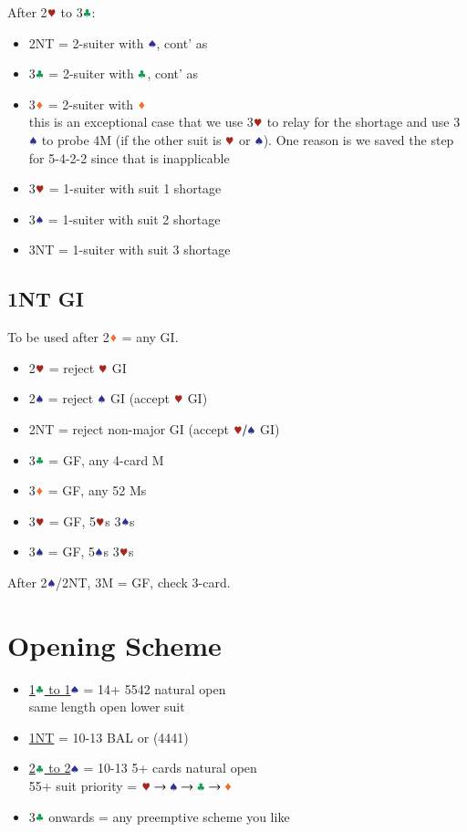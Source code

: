 \documentclass{article}
\begin{document}
\begin{multicols}{2}
\noindent After 2$\hhh$ to 3$\ccc$:
\begin{itemize}
    \item 2NT = 2-suiter with $\sss$, cont' as 
    \item 3$\ccc$ = 2-suiter with $\ccc$, cont' as 
    \item 3$\ddd$ = 2-suiter with $\ddd$ \\
        this is an exceptional case that we use 3$\hhh$ to relay for the shortage and use 3$\sss$ to probe 4M (if the other suit is $\hhh$ or $\sss$). One reason is we saved the step for 5-4-2-2 since that is inapplicable
    \item 3$\hhh$ = 1-suiter with suit 1 shortage
    \item 3$\sss$ = 1-suiter with suit 2 shortage
    \item 3NT = 1-suiter with suit 3 shortage
\end{itemize}

\subsection{1NT GI}\label{sec:1n-gi}
To be used after 2$\ddd$ = any GI.

\begin{itemize}
    \item 2$\hhh$ = reject $\hhh$ GI
    \item 2$\sss$ = reject $\sss$ GI (accept $\hhh$ GI)
    \item 2NT = reject non-major GI (accept $\hhh/\sss$ GI)
    \item 3$\ccc$ = GF, any 4-card M
    \item 3$\ddd$ = GF, any 52 Ms
    \item 3$\hhh$ = GF, 5$\hhh$s 3$\sss$s
    \item 3$\sss$ = GF, 5$\sss$s 3$\hhh$s
\end{itemize}

\noindent After 2$\sss$/2NT, 3M = GF, check 3-card.

\section{Opening Scheme}
\begin{itemize}
    \item \hyperref[sec:strong-1]{1$\ccc$ to 1$\sss$} = 14+ 5542 natural open \\
    same length open lower suit
    \item \hyperref[sec:1n]{1NT} = 10-13 BAL or (4441)
    \item \hyperref[sec:intermediate-2]{2$\ccc$ to 2$\sss$} = 10-13 5+ cards natural open \\
        55+ suit priority = $\hscd$
    \item 3$\ccc$ onwards = any preemptive scheme you like
\end{itemize}


\end{multicols}
\end{document}
